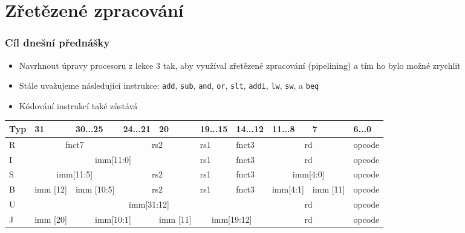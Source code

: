 \documentclass{beamer}
\subtitle{Lekce 05. Zřetězené zpracování\\Pipelining}
\author{Pavel Píša \phantom{xxxxxxx} Petr Štěpán \\ \small\texttt{pisa@fel.cvut.cz}\phantom{xxxx}\small\texttt{stepan@fel.cvut.cz}}
\begin{document}
\maketitle

\section{Zřetězené zpracování}

\begin{frame}
\frametitle{Cíl dnešní přednášky}

\begin{itemize}
 \item Navrhnout úpravy procesoru z lekce 3 tak, aby využíval zřetězené zpracování (pipelining) a tím ho bylo možné zrychlit
 \item Stále uvažujeme následující instrukce: \texttt{add}, \texttt{sub}, \texttt{and}, \texttt{or}, \texttt{slt}, \texttt{addi}, \texttt{lw}, \texttt{sw}, a \texttt{beq}
 \item Kódování instrukcí také zůstává
\end{itemize}

\begin{table}
\footnotesize
\begin{tabular}{|m{0.4cm}|m{0.4cm}|m{1.0cm}|m{1.0cm}|m{0.4cm}|m{1.0cm}|m{1.0cm}|m{1.0cm}|m{0.4cm}|m{1.0cm}|}\hline
Typ & 31 & 30...25 & 24...21 & 20 & 19...15 & 14...12 & 11...8 & 7 & 6...0 \\ \hline
R & \multicolumn{2}{c|}{ fnct7 } & \multicolumn{2}{c|}{ rs2 } & rs1 & fnct3 &\multicolumn{2}{c|}{ rd } & opcode\\ \hline
I & \multicolumn{4}{c|}{ imm[11:0] } & rs1 & fnct3 &\multicolumn{2}{c|}{ rd } & opcode\\ \hline
S & \multicolumn{2}{c|}{ imm[11:5] } & \multicolumn{2}{c|}{ rs2 } & rs1 & fnct3 &\multicolumn{2}{c|}{ imm[4:0] } & opcode\\ \hline
B & imm [12] & imm [10:5]  & \multicolumn{2}{c|}{ rs2 } & rs1 & fnct3 & imm[4:1]& imm [11] & opcode\\ \hline
U & \multicolumn{6}{c|}{ imm[31:12] }  & \multicolumn{2}{c|}{ rd } & opcode\\ \hline
J & imm [20] & \multicolumn{2}{c|}{ imm[10:1] } & imm [11] & \multicolumn{2}{c|}{ imm[19:12] } & \multicolumn{2}{c|}{ rd } & opcode\\ \hline
\end{tabular}
\end{table}

\end{frame}
\end{document}
